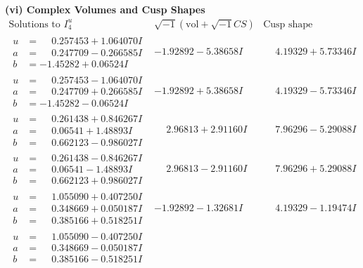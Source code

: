 \documentclass[1p]{elsarticle_modified}
\theoremstyle{definition}
\newcommand{\I}{\sqrt{-1}}
\begin{document}
\newpage\flushleft \textbf{(vi) Complex Volumes and Cusp Shapes}
$$\begin{array}{c|c|c}  
\text{Solutions to }I^u_{4}& \I (\text{vol} + \sqrt{-1}CS) & \text{Cusp shape}\\
 \hline 
\begin{aligned}
u &= \phantom{-}0.257453 + 1.064070 I \\
a &= \phantom{-}0.247709 - 0.266585 I \\
b &= -1.45282 + 0.06524 I\end{aligned}
 & -1.92892 - 5.38658 I & \phantom{-}4.19329 + 5.73346 I \\ \hline\begin{aligned}
u &= \phantom{-}0.257453 - 1.064070 I \\
a &= \phantom{-}0.247709 + 0.266585 I \\
b &= -1.45282 - 0.06524 I\end{aligned}
 & -1.92892 + 5.38658 I & \phantom{-}4.19329 - 5.73346 I \\ \hline\begin{aligned}
u &= \phantom{-}0.261438 + 0.846267 I \\
a &= \phantom{-}0.06541 + 1.48893 I \\
b &= \phantom{-}0.662123 - 0.986027 I\end{aligned}
 & \phantom{-}2.96813 + 2.91160 I & \phantom{-}7.96296 - 5.29088 I \\ \hline\begin{aligned}
u &= \phantom{-}0.261438 - 0.846267 I \\
a &= \phantom{-}0.06541 - 1.48893 I \\
b &= \phantom{-}0.662123 + 0.986027 I\end{aligned}
 & \phantom{-}2.96813 - 2.91160 I & \phantom{-}7.96296 + 5.29088 I \\ \hline\begin{aligned}
u &= \phantom{-}1.055090 + 0.407250 I \\
a &= \phantom{-}0.348669 + 0.050187 I \\
b &= \phantom{-}0.385166 + 0.518251 I\end{aligned}
 & -1.92892 - 1.32681 I & \phantom{-}4.19329 - 1.19474 I \\ \hline\begin{aligned}
u &= \phantom{-}1.055090 - 0.407250 I \\
a &= \phantom{-}0.348669 - 0.050187 I \\
b &= \phantom{-}0.385166 - 0.518251 I\end{aligned}

\end{array}$$
\end{document}
